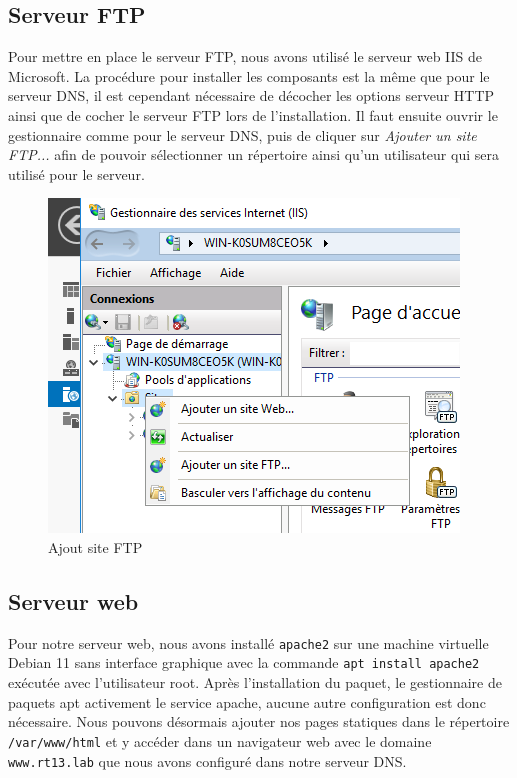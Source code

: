 \documentclass{article}
\begin{document}
\subsection{Serveur FTP}
Pour mettre en place le serveur FTP, nous avons utilisé le serveur web IIS de Microsoft.
La procédure pour installer les composants est la même que pour le serveur DNS, il est cependant nécessaire de décocher les options serveur HTTP ainsi que de cocher le serveur FTP lors de l'installation.
Il faut ensuite ouvrir le gestionnaire comme pour le serveur DNS, puis de cliquer sur \emph{Ajouter un site FTP...} afin de pouvoir sélectionner un répertoire ainsi qu'un utilisateur qui sera utilisé pour le serveur.
\begin{figure}[H]
    \begin{center}
        \includegraphics[scale=0.58]{fig/ftp1.png} %
    \end{center}
    \caption{Ajout site FTP}
    \label{serv:ftp1}
\end{figure}

\subsection{Serveur web}
Pour notre serveur web, nous avons installé \verb|apache2| sur une machine virtuelle Debian 11 sans interface graphique avec la commande \verb|apt install apache2| exécutée avec l'utilisateur root.
Après l'installation du paquet, le gestionnaire de paquets apt activement le service apache, aucune autre configuration est donc nécessaire.
Nous pouvons désormais ajouter nos pages statiques dans le répertoire \verb|/var/www/html| et y accéder dans un navigateur web avec le domaine \verb|www.rt13.lab| que nous avons configuré dans notre serveur DNS.
\end{document}
